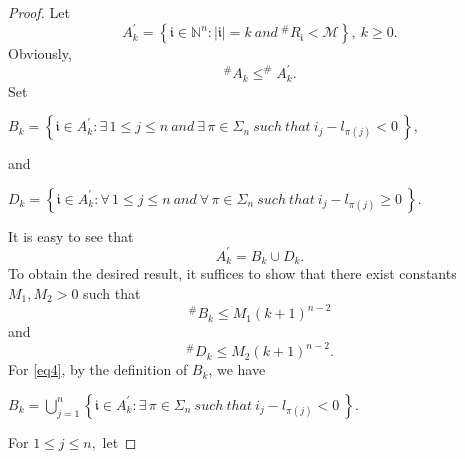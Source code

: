\documentclass[11pt]{article}
\theoremstyle{plain}
\theoremstyle{definition}
\begin{document}
\begin{proof}
Let \begin{equation}\label{eq31001}A_{k}^{\prime}=\left \{  \mathfrak{i} \in \mathbb{N}^n: | \mathfrak{i}  |=k \ and \ ^{\#  }	R_{\mathfrak{i}  } <\mathscr{M}    \right \},~ k \geq 0.\end{equation}
Obviously,  $$^{\#  }A_{k} \leq ^{\#  }A_{k}^{\prime}.$$
	Set
	\begin{center}
		$B_{k}=\left \{  \mathfrak{i}  \in A_{k}^{\prime}:\exists \, 1\le j\le n \  and \  \exists \, \pi \in \Sigma_{n} \ such \  that \  i_{j}-l_{\pi(j)}<0  \   \right \},$
	\end{center}
	and
	\begin{center}
		$D_{k}=\left \{  \mathfrak{i} \in A_{k}^{\prime}:\forall \, 1\le j\le n \  and \  \forall \, \pi \in \Sigma_{n} \ such \  that \  i_{j}-l_{\pi(j)}\ge 0  \   \right \}.$
	\end{center}
	It is easy to see that \begin{equation}\label{eq4151}A_{k}^{\prime} = B_{k}\cup D_{k}.\end{equation}
To obtain the desired result, it suffices to show that there exist constants $M_1,M_2>0$ such that
	\begin{equation}\label{eq4}
		^{\#  } B_{k} \le M_{1}\left ( k+1 \right ) ^{n-2}
	\end{equation}
and 
	\begin{equation}\label{eq5}
		^{\#  } D_{k}  \le  M_{2} \left ( k+1 \right ) ^{n-2}.
	\end{equation}
For \eqref{eq4}, by the definition of $B_{k}$, we have
	\begin{center}
		$B_{k}=\bigcup\limits_{j=1}^{n} \left \{ \mathfrak{i}  \in A_{k}^{\prime}:\exists \, \pi \in \Sigma_{n} \ such \  that \  i_{j}-l_{\pi(j)}<0  \   \right \}.$
	\end{center}
For $ 1 \le j \le n,$	let
	

\end{proof}
\end{document}

